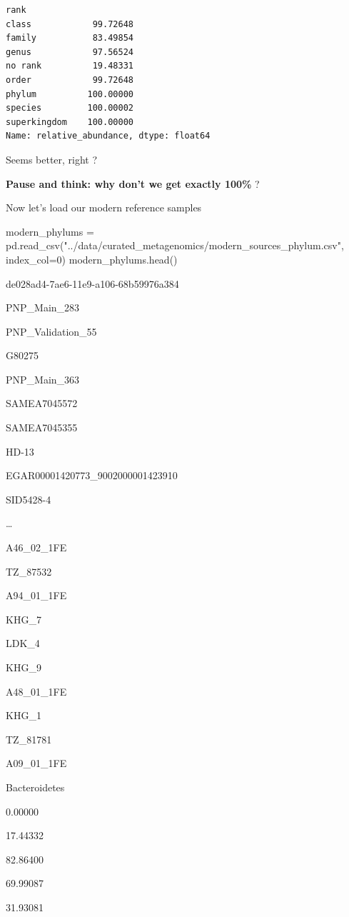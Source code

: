 \documentclass[
  letterpaper,
]{book}
\newenvironment{Shaded}{}{}
\newcommand{\DecValTok}[1]{\textcolor[rgb]{0.00,0.36,0.77}{#1}}
\newcommand{\NormalTok}[1]{\textcolor[rgb]{0.14,0.16,0.18}{#1}}
\newcommand{\OperatorTok}[1]{\textcolor[rgb]{0.14,0.16,0.18}{#1}}
\newcommand{\StringTok}[1]{\textcolor[rgb]{0.01,0.18,0.38}{#1}}
\begin{document}
\begin{verbatim}
rank
class            99.72648
family           83.49854
genus            97.56524
no rank          19.48331
order            99.72648
phylum          100.00000
species         100.00002
superkingdom    100.00000
Name: relative_abundance, dtype: float64
\end{verbatim}

Seems better, right ?

\textbf{Pause and think: why don't we get exactly 100\%} ?

Now let's load our modern reference samples

\begin{Shaded}
\begin{Highlighting}[]
\NormalTok{modern\_phylums }\OperatorTok{=}\NormalTok{ pd.read\_csv(}\StringTok{"../data/curated\_metagenomics/modern\_sources\_phylum.csv"}\NormalTok{, index\_col}\OperatorTok{=}\DecValTok{0}\NormalTok{)}
\NormalTok{modern\_phylums.head()}
\end{Highlighting}
\end{Shaded}

de028ad4-7ae6-11e9-a106-68b59976a384

PNP\_Main\_283

PNP\_Validation\_55

G80275

PNP\_Main\_363

SAMEA7045572

SAMEA7045355

HD-13

EGAR00001420773\_9002000001423910

SID5428-4

\ldots{}

A46\_02\_1FE

TZ\_87532

A94\_01\_1FE

KHG\_7

LDK\_4

KHG\_9

A48\_01\_1FE

KHG\_1

TZ\_81781

A09\_01\_1FE

Bacteroidetes

0.00000

17.44332

82.86400

69.99087

31.93081
\end{document}
